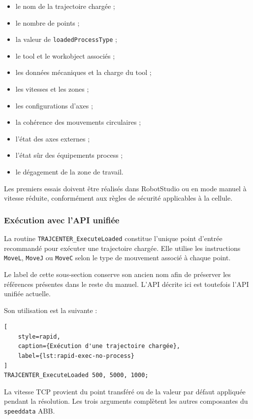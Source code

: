 \documentclass{rapportENSAM}
\begin{document}
\begin{itemize}
    \item le nom de la trajectoire chargée ;
    \item le nombre de points ;
    \item la valeur de \texttt{loadedProcessType} ;
    \item le tool et le workobject associés ;
    \item les données mécaniques et la charge du tool ;
    \item les vitesses et les zones ;
    \item les configurations d'axes ;
    \item la cohérence des mouvements circulaires ;
    \item l'état des axes externes ;
    \item l'état sûr des équipements process ;
    \item le dégagement de la zone de travail.
\end{itemize}

Les premiers essais doivent être réalisés dans RobotStudio ou en mode manuel à
vitesse réduite, conformément aux règles de sécurité applicables à la cellule.


\subsubsection{Exécution avec l'API unifiée}
\label{subsubsec:rapid-execution-no-process}

La routine \texttt{TRAJCENTER\_ExecuteLoaded} constitue l'unique point
d'entrée recommandé pour exécuter une trajectoire chargée. Elle utilise les
instructions \texttt{MoveL}, \texttt{MoveJ} ou \texttt{MoveC} selon le type
de mouvement associé à chaque point.

Le label de cette sous-section conserve son ancien nom afin de préserver les
références présentes dans le reste du manuel. L'API décrite ici est toutefois
l'API unifiée actuelle.

Son utilisation est la suivante :

\begin{lstlisting}[
    style=rapid,
    caption={Exécution d'une trajectoire chargée},
    label={lst:rapid-exec-no-process}
]
TRAJCENTER_ExecuteLoaded 500, 5000, 1000;
\end{lstlisting}

La vitesse TCP provient du point transféré ou de la valeur par défaut appliquée
pendant la résolution. Les trois arguments complètent les autres composantes du
\texttt{speeddata} ABB.
\end{document}
